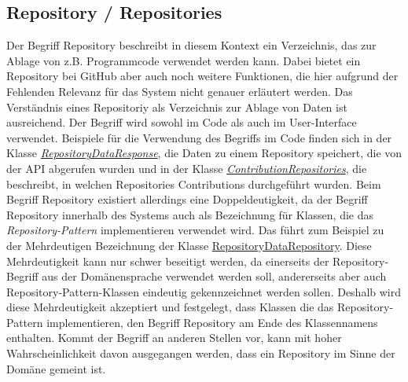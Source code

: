 \documentclass[12pt]{article}
\begin{document}
\subsection*{Repository / Repositories}
Der Begriff Repository beschreibt in diesem Kontext ein Verzeichnis, das zur Ablage von z.B. Programmcode verwendet werden kann.
Dabei bietet ein Repository bei GitHub aber auch noch weitere Funktionen, die hier aufgrund der Fehlenden Relevanz für das System nicht genauer erläutert werden.
Das Verständnis eines Repositoriy als Verzeichnis zur Ablage von Daten ist ausreichend.
Der Begriff wird sowohl im Code als auch im User-Interface verwendet.
Beispiele für die Verwendung des Begriffs im Code finden sich in der Klasse \href{https://github.com/lukaspanni/OpenSourceStats/blob/main/app/src/main/java/de/lukaspanni/opensourcestats/data/RepositoryDataResponse.java}{\textit{RepositoryDataResponse}}, die Daten zu einem Repository speichert, die von der API abgerufen wurden und in der Klasse \href{https://github.com/lukaspanni/OpenSourceStats/blob/main/app/src/main/java/de/lukaspanni/opensourcestats/data/ContributionRepositories.java}{\textit{ContributionRepositories}}, die beschreibt, in welchen Repositories Contributions durchgeführt wurden.
\newline
Beim Begriff Repository existiert allerdings eine Doppeldeutigkeit, da der Begriff Repository innerhalb des Systems auch als Bezeichnung für Klassen, die das \textit{Repository-Pattern} implementieren verwendet wird. Das führt zum Beispiel zu der Mehrdeutigen Bezeichnung der Klasse \href{https://github.com/lukaspanni/OpenSourceStats/blob/main/app/src/main/java/de/lukaspanni/opensourcestats/repository/RepositoryDataRepository.java}{RepositoryDataRepository}. Diese Mehrdeutigkeit kann nur schwer beseitigt werden, da einerseits der Repository-Begriff aus der Domänensprache verwendet werden soll, andererseits aber auch Repository-Pattern-Klassen eindeutig gekennzeichnet werden sollen. Deshalb wird diese Mehrdeutigkeit akzeptiert und festgelegt, dass Klassen die das Repository-Pattern implementieren, den Begriff Repository am Ende des Klassennamens enthalten. Kommt der Begriff an anderen Stellen vor, kann mit hoher Wahrscheinlichkeit davon ausgegangen werden, dass ein Repository im Sinne der Domäne gemeint ist.
\end{document}
